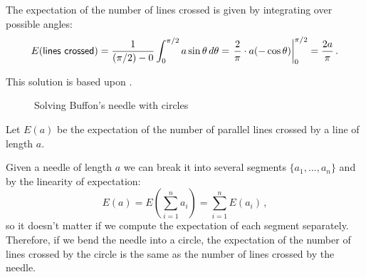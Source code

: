 The expectation of the number of lines crossed is given by integrating over possible angles:
\begin{equation}\label{eq.buffon-integral}
E(\textsf{lines crossed}) =
  \displaystyle\frac{1}{(\pi/2)-0} \int_0^{\pi/2} a\sin \theta\,
  d\theta=\left.\displaystyle\frac{2}{\pi}\cdot a (-\cos \theta)
  \right|_0^{\pi/2}=\displaystyle\frac{2a}{\pi}\,.
\end{equation}



This solution is based upon \cite[Chapter~26]{proofs}.

\begin{figure}[tb]
\begin{center}
\end{center}
\caption{Solving Buffon's needle with circles}\label{f.buffon3}
\end{figure}

Let $E(a)$ be the expectation of the number of parallel lines crossed by a line of length $a$.

Given a needle of length $a$ we can break it into several segments $\{a_1,\ldots,a_n\}$ and by the linearity of expectation:
\[
E(a) = E\left(\sum_{i=1}^{n} a_i\right) = \sum_{i=1}^{n} E(a_i)\,, 
\]
so it doesn't matter if we compute the expectation of each segment separately. Therefore, if we bend the needle into a circle, the expectation of the number of lines crossed by the circle is the same as the number of lines crossed by the needle.

